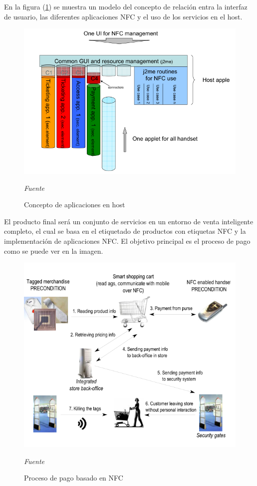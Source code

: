 \documentclass[11pt,openany]{book}
\begin{document}
	En la figura (\ref{concepto_de_host}) se muestra un modelo del concepto de relación entra la  interfaz de usuario, las diferentes aplicaciones NFC y el uso de los servicios en el host.
	\begin{figure}[htb]
			\centering
			\includegraphics[scale = 0.6]{imagenes/host.PNG}
			\caption{Concepto de aplicaciones en host}
			\textsl{Fuente }\cite{Benyo2007,Benyo2009}
			\label{concepto_de_host}
	\end{figure}
	\newpage
	El producto final será un conjunto de servicios en un entorno de venta inteligente completo, el cual se basa en el etiquetado de productos con etiquetas NFC y la implementación de aplicaciones NFC. El objetivo principal es el proceso de pago como se puede ver en la imagen.
	\begin{figure}[htb]
			\centering
			\includegraphics[scale = 0.6]{imagenes/sistema_NFC.PNG}
			\caption{Proceso de pago basado en NFC}
			\textsl{Fuente }\cite{Benyo2007,Benyo2009}
			\label{Sistema_NFC}
	\end{figure}
	\newpage
\end{document}
